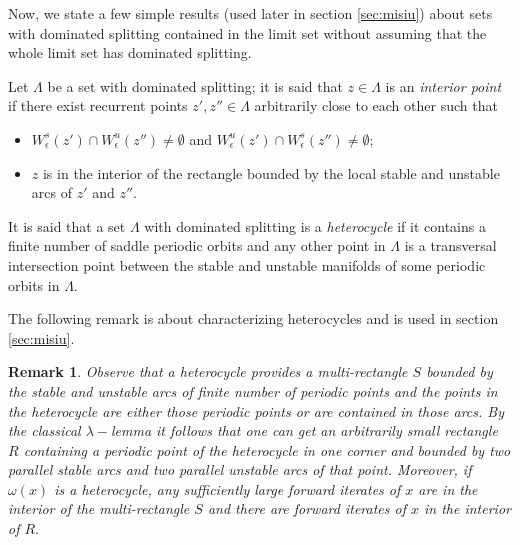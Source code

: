 \documentclass[a4paper,11pt]{article}
\newtheorem{proposition}[lemma]{Proposition}
\newtheorem{remark}[lemma]{Remark}
\theoremstyle{definition}
\def\La{\Lambda}
\def\la{\lambda}
\def\eps{\epsilon}
\def\La{\Lambda}
\def\eps{\epsilon}
\begin{document}
Now, we state a few simple results (used later in section \ref{sec:misiu}) about sets with dominated splitting contained in the limit set without assuming that the whole limit set has dominated splitting.

Let $\La$ be a set with dominated splitting; it is said that $z\in \La$ is an {\it interior point} if there exist recurrent points $z', z'' \in \La$ arbitrarily close to each other such that 

\begin{itemize}
    \item[--] $W^{s}_\eps(z')\cap W^u_\eps(z'')\neq \emptyset $ and $W^{u}_\eps(z')\cap W^s_\eps(z'')\neq \emptyset;$ 

    \item[--] $z$ is in the interior of the rectangle bounded by the local stable and unstable arcs of $z'$ and $z''.$ 
\end{itemize}

 
    
It is said that a set $\La$ with dominated splitting is a {\it heterocycle} if it contains a finite number of  saddle periodic orbits and any other point in $\La$ is a transversal intersection point between the stable and unstable manifolds of some  periodic orbits in $\La.$  

The following remark  is about characterizing heterocycles and is used in section \ref{sec:misiu}.

\begin{remark}\label{rmk:heterocycle}
Observe that a heterocycle provides a multi-rectangle $S$ bounded by  the stable and unstable arcs of finite number of periodic points and the points in the heterocycle are either those periodic points or are contained in   those arcs. By the classical $\la-$lemma it follows that one can get an arbitrarily small rectangle $R$ containing a periodic point of the heterocycle in one corner and bounded by two parallel stable arcs and two parallel unstable arcs of that point. Moreover, if $\omega(x)$ is a heterocycle, any sufficiently large forward iterates of $x$ are in the interior of the multi-rectangle $S$ and there are forward iterates of $x$ in the interior  of $R.$
\end{remark}


\end{document}
